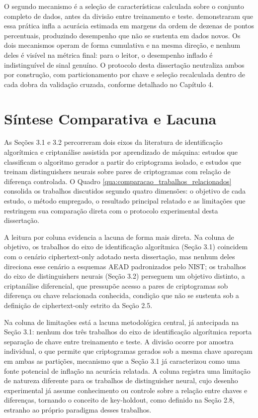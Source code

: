 O segundo mecanismo é a seleção de características calculada sobre o conjunto completo de dados, antes da divisão entre treinamento e teste.  demonstraram que essa prática infla a acurácia estimada em margens da ordem de dezenas de pontos percentuais, produzindo desempenho que não se sustenta em dados novos. Os dois mecanismos operam de forma cumulativa e na mesma direção, e nenhum deles é visível na métrica final: para o leitor, o desempenho inflado é indistinguível de sinal genuíno. O protocolo desta dissertação neutraliza ambos por construção, com particionamento por chave e seleção recalculada dentro de cada dobra da validação cruzada, conforme detalhado no Capítulo 4.

\section{Síntese Comparativa e Lacuna}
As Seções 3.1 e 3.2 percorreram dois eixos da literatura de identificação algorítmica e criptanálise assistida por aprendizado de máquina: estudos que classificam o algoritmo gerador a partir do criptograma isolado, e estudos que treinam distinguishers neurais sobre pares de criptogramas com relação de diferença controlada. O Quadro \ref{qua:comparacao_trabalhos_relacionados} consolida os trabalhos discutidos segundo quatro dimensões: o objetivo de cada estudo, o método empregado, o resultado principal relatado e as limitações que restringem sua comparação direta com o protocolo experimental desta dissertação.

A leitura por coluna evidencia a lacuna de forma mais direta. Na coluna de objetivo, os trabalhos do eixo de identificação algorítmica (Seção 3.1) coincidem com o cenário ciphertext-only adotado nesta dissertação, mas nenhum deles direciona esse cenário a esquemas AEAD padronizados pelo NIST; os trabalhos do eixo de distinguishers neurais (Seção 3.2) perseguem um objetivo distinto, a criptanálise diferencial, que pressupõe acesso a pares de criptogramas sob diferença ou chave relacionada conhecida, condição que não se sustenta sob a definição de ciphertext-only estrito da Seção 2.5.

Na coluna de limitações está a lacuna metodológica central, já antecipada na Seção 3.1: nenhum dos três trabalhos do eixo de identificação algorítmica reporta separação de chave entre treinamento e teste. A divisão ocorre por amostra individual, o que permite que criptogramas gerados sob a mesma chave apareçam em ambas as partições, mecanismo que a Seção 3.1 já caracterizou como uma fonte potencial de inflação na acurácia relatada. A coluna registra uma limitação de natureza diferente para os trabalhos de distinguisher neural, cujo desenho experimental já assume conhecimento ou controle sobre a relação entre chaves e diferenças, tornando o conceito de key-holdout, como definido na Seção 2.8, estranho ao próprio paradigma desses trabalhos.

